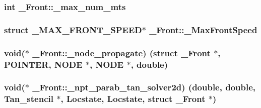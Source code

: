 \subsubsection[{\texorpdfstring{\+\_\+max\+\_\+num\+\_\+mts}{_max_num_mts}}]{\setlength{\rightskip}{0pt plus 5cm}int \+\_\+\+Front\+::\+\_\+max\+\_\+num\+\_\+mts}\hypertarget{struct___front_aad3a64429ffed6ad03d400930dbeb516}{}\label{struct___front_aad3a64429ffed6ad03d400930dbeb516}
\subsubsection[{\texorpdfstring{\+\_\+\+Max\+Front\+Speed}{_MaxFrontSpeed}}]{\setlength{\rightskip}{0pt plus 5cm}struct {\bf \+\_\+\+M\+A\+X\+\_\+\+F\+R\+O\+N\+T\+\_\+\+S\+P\+E\+ED}$\ast$ \+\_\+\+Front\+::\+\_\+\+Max\+Front\+Speed}\hypertarget{struct___front_a82a3b5f8335fd8f7247ae9dbdae2660c}{}\label{struct___front_a82a3b5f8335fd8f7247ae9dbdae2660c}
\subsubsection[{\texorpdfstring{\+\_\+node\+\_\+propagate}{_node_propagate}}]{\setlength{\rightskip}{0pt plus 5cm}void($\ast$ \+\_\+\+Front\+::\+\_\+node\+\_\+propagate) (struct {\bf \+\_\+\+Front} $\ast$, {\bf P\+O\+I\+N\+T\+ER}, {\bf N\+O\+DE} $\ast$, {\bf N\+O\+DE} $\ast$, double)}\hypertarget{struct___front_a73ec8b453a666190a2325bba789dfebb}{}\label{struct___front_a73ec8b453a666190a2325bba789dfebb}
\subsubsection[{\texorpdfstring{\+\_\+npt\+\_\+parab\+\_\+tan\+\_\+solver2d}{_npt_parab_tan_solver2d}}]{\setlength{\rightskip}{0pt plus 5cm}void($\ast$ \+\_\+\+Front\+::\+\_\+npt\+\_\+parab\+\_\+tan\+\_\+solver2d) (double, double, {\bf Tan\+\_\+stencil} $\ast$, {\bf Locstate}, {\bf Locstate}, struct {\bf \+\_\+\+Front} $\ast$)}\hypertarget{struct___front_a91636124e14bce2d1fbe1d0e370db9fb}{}\label{struct___front_a91636124e14bce2d1fbe1d0e370db9fb}
